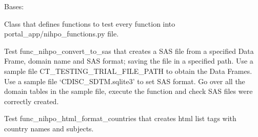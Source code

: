 \documentclass[letterpaper,10pt,english]{sphinxmanual}
\begin{document}
\begin{fulllineitems}
\label{\detokenize{CE_app.tests:CE_app.tests.test_nihpo_functions.TrialTestCase}}
\sphinxAtStartPar
Bases: {\hyperref[\detokenize{CE_app.tests:CE_app.tests.NihpoTestClass}]{}}

\sphinxAtStartPar
Class that defines functions to test every function into portal\_app/nihpo\_functions.py file.

\begin{fulllineitems}
\label{\detokenize{CE_app.tests:CE_app.tests.test_nihpo_functions.TrialTestCase.test_func_nihpo_convert_to_sas}}
\sphinxAtStartPar
Test func\_nihpo\_convert\_to\_sas that creates a SAS file from a specified Data Frame, domain name and SAS format;
saving the file in a specified path.
Use a sample file CT\_TESTING\_TRIAL\_FILE\_PATH to obtain the Data Frames.
Use a sample file ‘CDISC\_SDTM.sqlite3’ to set SAS format.
Go over all the domain tables in the sample file, execute the function and check SAS files were correctly created.

\end{fulllineitems}


\begin{fulllineitems}
\label{\detokenize{CE_app.tests:CE_app.tests.test_nihpo_functions.TrialTestCase.test_func_nihpo_html_format_countries}}
\sphinxAtStartPar
Test func\_nihpo\_html\_format\_countries that creates html list tags with country names and subjects.


\end{fulllineitems}
\end{fulllineitems}
\end{document}
